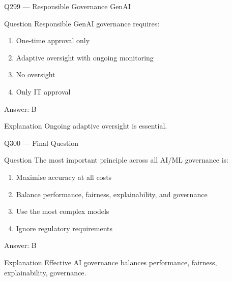 \documentclass[aspectratio=169,8pt]{beamer}
\begin{document}
										\begin{frame}{Q299 --- Responsible Governance GenAI}
											\begin{block}{Question}
												Responsible GenAI governance requires:
												\begin{enumerate}
													\item One-time approval only
													\item Adaptive oversight with ongoing monitoring
													\item No oversight
													\item Only IT approval
												\end{enumerate}
											\end{block}
											\begin{exampleblock}{Answer: B}\end{exampleblock}
											\begin{block}{Explanation}
												Ongoing adaptive oversight is essential.
											\end{block}
										\end{frame}
										
										\begin{frame}{Q300 --- Final Question}
											\begin{block}{Question}
												The most important principle across all AI/ML governance is:
												\begin{enumerate}
													\item Maximise accuracy at all costs
													\item Balance performance, fairness, explainability, and governance
													\item Use the most complex models
													\item Ignore regulatory requirements
												\end{enumerate}
											\end{block}
											\begin{exampleblock}{Answer: B}\end{exampleblock}
											\begin{block}{Explanation}
												Effective AI governance balances performance, fairness, explainability, governance.
											\end{block}
										\end{frame}
										
						
										
									
\end{document}
